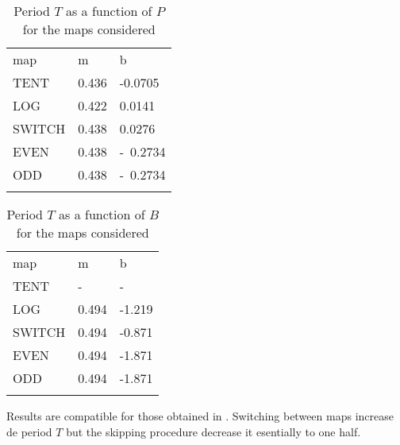 \begin{table}
\caption{Period $T$ as a function of $P$ for the maps considered}
\label{tabla:tab1}       %
\begin{tabular}{lll}
\hline\noalign{\smallskip}
map & m & b  \\
\noalign{\smallskip}\hline\noalign{\smallskip}
TENT&0.436 & -0.0705 \\
LOG &0.422 & 0.0141 \\
SWITCH &0.438 & 0.0276 \\
EVEN &0.438 & -~0.2734 \\
ODD &0.438 & -~0.2734 \\
\noalign{\smallskip}\hline
\end{tabular}
\end{table}
%
\begin{table}
\caption{Period $T$ as a function of $B$ for the maps considered}
\label{tabla:tab2}       %
\begin{tabular}{lll}
\hline\noalign{\smallskip}
map & m & b  \\
\noalign{\smallskip}\hline\noalign{\smallskip}
TENT&- & - \\
LOG &0.494 & -1.219 \\
SWITCH &0.494 & -0.871 \\
EVEN &0.494 & -1.871 \\
ODD &0.494 & -1.871 \\
\noalign{\smallskip}\hline
\end{tabular}
\end{table}
Results are compatible for those obtained in \cite{Nagaraj2008}. Switching between maps increase de period $T$ but the skipping procedure decrease it esentially to one half. 
% 


